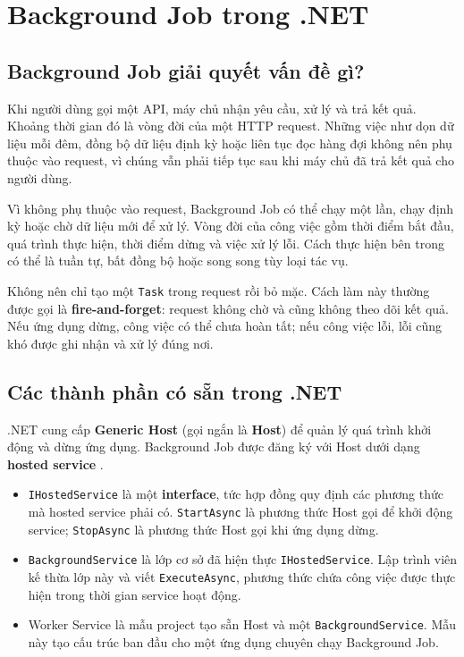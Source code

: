 \section{Background Job trong .NET}

\subsection{Background Job giải quyết vấn đề gì?}

Khi người dùng gọi một API, máy chủ nhận yêu cầu, xử lý và trả kết quả. Khoảng thời
gian đó là vòng đời của một HTTP request. Những việc như dọn dữ liệu mỗi đêm, đồng
bộ dữ liệu định kỳ hoặc liên tục đọc hàng đợi không nên phụ thuộc vào request, vì
chúng vẫn phải tiếp tục sau khi máy chủ đã trả kết quả cho người dùng.

Vì không phụ thuộc vào request, Background Job có thể chạy một lần, chạy định kỳ hoặc
chờ dữ liệu mới để xử lý. Vòng đời của công việc gồm thời điểm bắt đầu, quá trình
thực hiện, thời điểm dừng và việc xử lý lỗi. Cách thực hiện bên trong có thể là tuần
tự, bất đồng bộ hoặc song song tùy loại tác vụ.

Không nên chỉ tạo một \texttt{Task} trong request rồi bỏ mặc. Cách làm này thường
được gọi là \textbf{fire-and-forget}: request không chờ và cũng không theo dõi kết
quả. Nếu ứng dụng dừng, công việc có thể chưa hoàn tất; nếu công việc lỗi, lỗi cũng
khó được ghi nhận và xử lý đúng nơi.

\subsection{Các thành phần có sẵn trong .NET}

.NET cung cấp \textbf{Generic Host} (gọi ngắn là \textbf{Host}) để quản lý quá trình
khởi động và dừng ứng dụng. Background Job được đăng ký với Host dưới dạng
\textbf{hosted service} \cite{ms-generic-host,ms-hosted-services}.

\begin{itemize}
  \item \texttt{IHostedService} là một \textbf{interface}, tức hợp đồng quy định
  các phương thức mà hosted service phải có. \texttt{StartAsync} là phương thức Host
  gọi để khởi động service; \texttt{StopAsync} là phương thức Host gọi khi ứng dụng
  dừng.

  \item \texttt{BackgroundService} là lớp cơ sở đã hiện thực
  \texttt{IHostedService}. Lập trình viên kế thừa lớp này và viết
  \texttt{ExecuteAsync}, phương thức chứa công việc được thực hiện trong thời gian
  service hoạt động.

  \item Worker Service là mẫu project tạo sẵn Host và một
  \texttt{BackgroundService}. Mẫu này tạo cấu trúc ban đầu cho một ứng dụng chuyên
  chạy Background Job.
\end{itemize}

